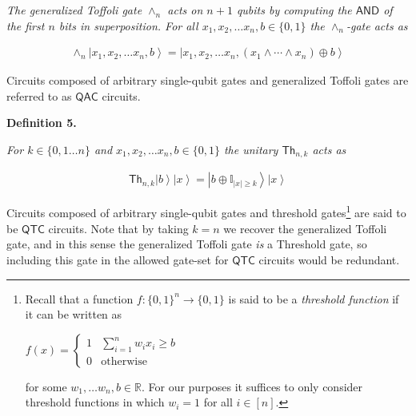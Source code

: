 \documentclass[10pt,a4paper]{article}
\begin{document}
\emph{The generalized Toffoli gate $\land_{n}$ acts on $n+1$ qubits by computing the $\mathsf{AND}$ of the first $n$ bits in superposition. For all $x_{1},x_{2},\dots x_{n},b\in\{0,1\}$ the $\wedge_{n}$-gate acts as}\par


\[\begin{gathered}
\displaystyle\land_{n}\left|x_{1},x_{2},\dots x_{n},b\right\rangle=\left|x_{1},x_{2},\dots x_{n},(x_{1}\land\cdots\land x_{n})\oplus b\right\rangle
\end{gathered}\]






Circuits composed of arbitrary single-qubit gates and generalized Toffoli gates are referred to as ${\mathsf{QAC}}$ circuits.\par





\par\medskip\noindent\textbf{
\textbf{Definition 5}\textbf{.}
}\par



\emph{For $k\in\{0,1\dots n\}$ and $x_{1},x_{2},\dots x_{n},b\in\{0,1\}$ the unitary $\mathsf{Th}_{n,k}$ acts as}\par


\[\begin{gathered}
\displaystyle\mathsf{Th}_{n,k}\left|b\right\rangle\left|x\right\rangle=\left|b\oplus\mathbb{I}_{|x|\geq k}\right\rangle\left|x\right\rangle
\end{gathered}\]






Circuits composed of arbitrary single-qubit gates and threshold gates\footnote{Recall that a function $f\colon\{0,1\}^{n}\to\{0,1\}$ is said to be a \emph{threshold function} if it can be written as





$\displaystyle f(x)=\begin{cases}1&\sum_{i=1}^{n}w_{i}x_{i}\geq b\\
0&\text{otherwise}\end{cases}$


for some $w_{1},\dots w_{n},b\in\mathbb{R}$. For our purposes it suffices to only consider threshold functions in which $w_{i}=1$ for all $i\in[n]$.} are said to be ${\mathsf{QTC}}$ circuits. Note that by taking $k=n$ we recover the generalized Toffoli gate, and in this sense the generalized Toffoli gate \emph{is} a Threshold gate, so including this gate in the allowed gate-set for ${\mathsf{QTC}}$ circuits would be redundant.\par
\end{document}
